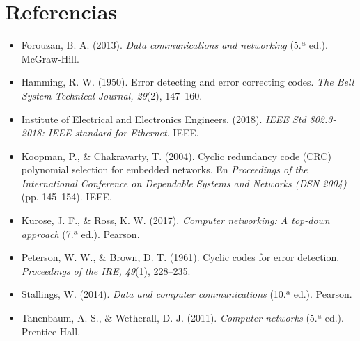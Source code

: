 \documentclass[12pt,letterpaper]{article}
\begin{document}
\newpage
\section*{Referencias}
\begin{itemize}[leftmargin=1.5em,itemsep=7pt]
\item[] Forouzan, B. A. (2013). \emph{Data communications and networking} (5.ª ed.). McGraw-Hill.
\item[] Hamming, R. W. (1950). Error detecting and error correcting codes. \emph{The Bell System Technical Journal, 29}(2), 147--160.
\item[] Institute of Electrical and Electronics Engineers. (2018). \emph{IEEE Std 802.3-2018: IEEE standard for Ethernet}. IEEE.
\item[] Koopman, P., \& Chakravarty, T. (2004). Cyclic redundancy code (CRC) polynomial selection for embedded networks. En \emph{Proceedings of the International Conference on Dependable Systems and Networks (DSN 2004)} (pp. 145--154). IEEE.
\item[] Kurose, J. F., \& Ross, K. W. (2017). \emph{Computer networking: A top-down approach} (7.ª ed.). Pearson.
\item[] Peterson, W. W., \& Brown, D. T. (1961). Cyclic codes for error detection. \emph{Proceedings of the IRE, 49}(1), 228--235.
\item[] Stallings, W. (2014). \emph{Data and computer communications} (10.ª ed.). Pearson.
\item[] Tanenbaum, A. S., \& Wetherall, D. J. (2011). \emph{Computer networks} (5.ª ed.). Prentice Hall.
\end{itemize}
\end{document}

